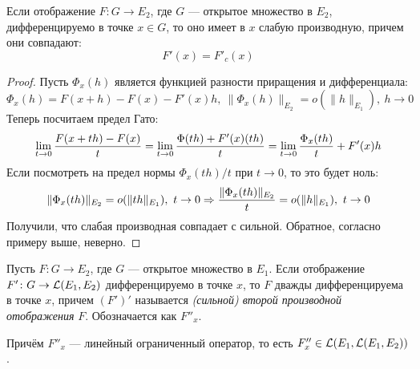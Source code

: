 \begin{proposition}
    Если отображение $F \colon G \to E_2$, где $G$ --- открытое множество в $E_2$, дифференцируемо в точке $x \in G$, то оно имеет в $x$ слабую производную, причем они совпадают:
    \[
    	F'(x) = F'_c(x)
    \]
\end{proposition}
\begin{proof}
    Пусть $\Phi_x(h)$ является функцией разности приращения и дифференциала:
    \[
    	\Phi_x(h) = F(x + h) - F(x) - F'(x)h,\ \|\Phi_x(h)\|_{E_2} = o(\|h\|_{E_1}),\ h \to 0
    \]
    Теперь посчитаем предел Гато:
    \[
        \lim_{t \to 0} \frac{F(x + th) - F(x)}{t} = \lim\limits_{t \to 0} \frac{\Phi(th) + F'(x)(th)}{t} = \lim_{t \to 0} \frac{\Phi_x(th)}{t} + F'(x)h
    \]
    Если посмотреть на предел нормы $\Phi_x(th) / t$ при $t \to 0$, то это будет ноль:
    \[
    	\|\Phi_x(th)\|_{E_2} = o(\|th\|_{E_1}),\ t \to 0 \Rightarrow \frac{\|\Phi_x(th)\|_{E_2}}{t} = o(\|h\|_{E_1}),\ t \to 0
    \]
    Получили, что слабая производная совпадает с сильной. Обратное, согласно примеру выше, неверно.
\end{proof}

\begin{definition}
	Пусть $F \colon G \to E_2$, где $G$ --- открытое множество в $E_1$. Если отображение $F' \colon G \to \mathcal{L}(E_1, E_2)$ дифференцируемо в точке $x$, то $F$ дважды дифференцируема в точке  $x$, причем $(F')'$ называется \textit{(сильной) второй производной отображения} $F$. Обозначается как $F''_x$.
	
	Причём $F''_x$ --- линейный ограниченный оператор, то есть $F''_x \in \mathcal{L}(E_1, \mathcal{L}(E_1, E_2))$.
\end{definition}


